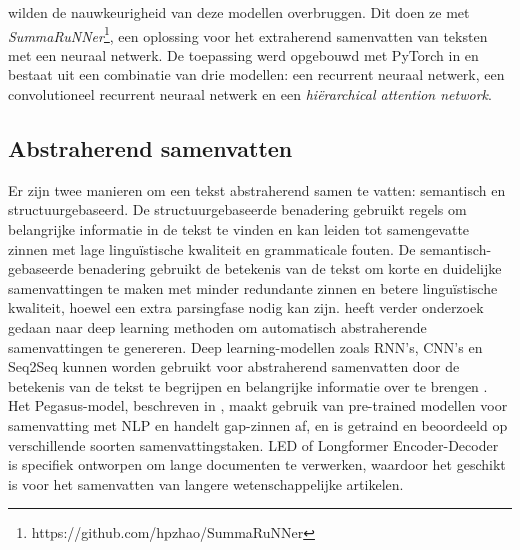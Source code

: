 \textcite{Nallapati2017} wilden de nauwkeurigheid van deze modellen overbruggen. Dit doen ze met \textit{SummaRuNNer}\footnote{https://github.com/hpzhao/SummaRuNNer}, een oplossing voor het extraherend samenvatten van teksten met een neuraal netwerk. De toepassing werd opgebouwd met PyTorch in  en bestaat uit een combinatie van drie modellen: een recurrent neuraal netwerk, een convolutioneel recurrent neuraal netwerk en een \textit{hiërarchical attention network}.

\subsection{Abstraherend samenvatten}
Er zijn twee manieren om een tekst abstraherend samen te vatten: semantisch en structuurgebaseerd. De structuurgebaseerde benadering gebruikt regels om belangrijke informatie in de tekst te vinden en kan leiden tot samengevatte zinnen met lage linguïstische kwaliteit en grammaticale fouten. De semantisch-gebaseerde benadering gebruikt de betekenis van de tekst om korte en duidelijke samenvattingen te maken met minder redundante zinnen en betere linguïstische kwaliteit, hoewel een extra parsingfase nodig kan zijn. \textcite{Cao2022} heeft verder onderzoek gedaan naar deep learning methoden om automatisch abstraherende samenvattingen te genereren. Deep learning-modellen zoals RNN's, CNN's en Seq2Seq kunnen worden gebruikt voor abstraherend samenvatten door de betekenis van de tekst te begrijpen en belangrijke informatie over te brengen \autocite{Suleiman2020}. Het Pegasus-model, beschreven in \textcite{Zhang2020}, maakt gebruik van pre-trained modellen voor samenvatting met NLP en handelt gap-zinnen af, en is getraind en beoordeeld op verschillende soorten samenvattingstaken. LED of Longformer Encoder-Decoder is specifiek ontworpen om lange documenten te verwerken, waardoor het geschikt is voor het samenvatten van langere wetenschappelijke artikelen. 


